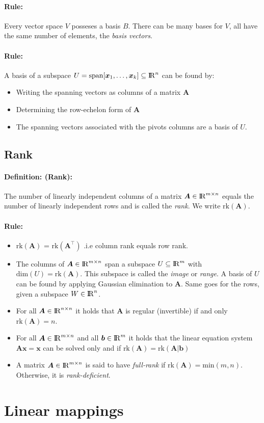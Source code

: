 \documentclass[12pt]{article}
\newcommand{\R}{{\rm I\!R}}
\newcommand{\A}{{\bm{A}}}
\newcommand{\vecs}[2]{{\bm{#1}_1, \dots, \bm{#1}_#2}}
\newcommand{\xdefinition}[2]{\paragraph{\colorbox{#1!30}{\textbf{Definition:}} (#2):}}
\newcommand{\xrule}[1]{\paragraph{\colorbox{#1!30}{\textbf{Rule:}}}}
\begin{document}
\xrule{blue} Every vector space $V$ posseses a basis $B$. There can be many bases for $V$, all have the same number of elements, the \textit{basis vectors}.

\xrule{blue} A basis of a subspace $U = \text{span}[\vecs{x}{k}] \subseteq \R^n$ can be found by:
%
\begin{itemize}
	\item Writing the spanning vectors as columns of a matrix $\A$
	\item Determining the row-echelon form of $\A$
	\item The spanning vectors associated with the pivots columns are a basis of $U$. 
\end{itemize}

\subsection{Rank}

\xdefinition{blue}{Rank} The number of linearly independent columns of a matrix $\A \in \R^{m \times n}$ equals the number of linearly independent rows and is called the \textit{rank}. We write $\text{rk}(\A)$.

\xrule{red}
%
\begin{itemize}
	\item $\text{rk}(\A)$ = $\text{rk}(\A^\top)$ .i.e column rank equals row rank.
	\item The columns of $\A \in \R^{m \times n}$ span a subspace $U \subseteq \R^m$ with $\text{dim}(U) = \text{rk}(\A)$. This subspace is called the \textit{image} or \textit{range}. A basis of $U$ can be found by applying Gaussian elimination to $\A$. Same goes for the rows, given a subspace $W \in \R^n$.	
	\item For all $\A \in \R^{n \times n}$ it holds that $\A$ is regular (invertible) if and only $\text{rk}(\A) = n$.
	\item For all $\A \in \R^{m \times n}$ and all $\bm{b} \in \R^m$ it holds that the linear equation system $\A \bm{x} = \bm{x}$ can be solved only and if $\text{rk}(\A) = \text{rk}(\A | \bm{b})$
	\item A matrix $\A \in \R^{m \times n}$ is said to have \textit{full-rank} if $\text{rk}(\A) = \text{min}(m, n)$. Otherwise, it is \textit{rank-deficient}.
\end{itemize}

\section{Linear mappings}
\end{document}
